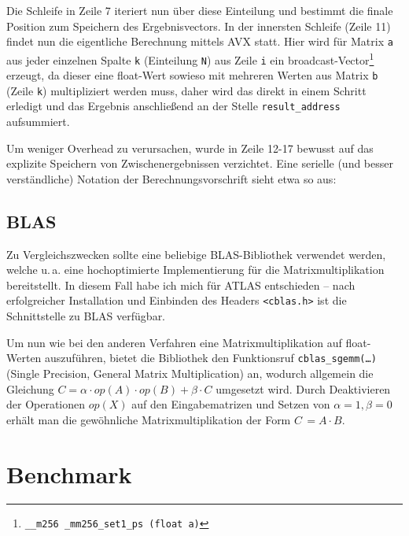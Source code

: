 \documentclass[a4paper,11pt]{scrartcl}
\newcommand{\ua}{\mbox{u.\,a.}\xspace}
\begin{document}
Die Schleife in Zeile 7 iteriert nun über diese Einteilung und bestimmt die finale Position zum 
Speichern des Ergebnisvectors. In der innersten Schleife (Zeile 11) findet nun die eigentliche
Berechnung mittels AVX statt. Hier wird für Matrix \texttt{a} aus jeder einzelnen Spalte
\texttt{k} (Einteilung \texttt{N})
aus Zeile \texttt{i} ein broadcast-Vector\footnote{\texttt{\_\_m256 \_mm256\_set1\_ps (float a)}}
erzeugt, da dieser eine float-Wert sowieso mit mehreren Werten aus Matrix \texttt{b} 
(Zeile \texttt{k}) multipliziert werden muss, daher wird das direkt in einem Schritt erledigt
und das Ergebnis anschließend an der Stelle \texttt{result\_address} aufsummiert.\newline

Um weniger Overhead zu verursachen, wurde in Zeile 12-17 bewusst auf das explizite Speichern von 
Zwischenergebnissen verzichtet. Eine serielle (und besser verständliche) Notation der
Berechnungsvorschrift sieht etwa so aus:



\subsection{BLAS}
Zu Vergleichszwecken sollte eine beliebige BLAS-Bibliothek verwendet werden, welche 
\ua eine hochoptimierte Implementierung für die Matrixmultiplikation bereitstellt.
In diesem Fall habe ich mich für ATLAS \cite{atlas} entschieden -- nach erfolgreicher
Installation und Einbinden des Headers \texttt{<cblas.h>} ist die Schnittstelle zu BLAS
 verfügbar.\newline



Um nun wie bei den anderen Verfahren eine Matrixmultiplikation auf float-Werten auszuführen, 
bietet die Bibliothek den Funktionsruf \texttt{cblas\_sgemm(…)} (Single Precision, General Matrix Multiplication) an, wodurch allgemein die Gleichung  $C = \alpha \cdot op(A) \cdot op(B) + 
\beta \cdot C$ \cite{blasqr} umgesetzt wird. Durch Deaktivieren der Operationen $op(X)$ auf den 
Eingabematrizen und Setzen von $\alpha = 1, \beta = 0$ erhält man die gewöhnliche Matrixmultiplikation 
der Form $C\,= A \cdot B$.

\section{Benchmark}
\end{document}
